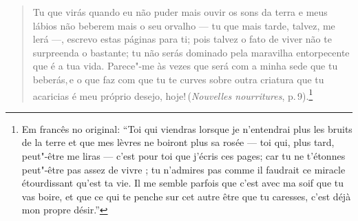 \begin{quote}
Tu que virás quando eu não puder mais ouvir os sons da terra e meus
lábios não beberem mais o seu orvalho --- tu que mais tarde, talvez, me
lerá ---, escrevo estas páginas para ti; pois talvez o fato de viver não te
surpreenda o bastante; tu não serás dominado pela maravilha entorpecente
que é a tua vida. Parece"-me às vezes que será com a minha sede que tu
beberás,\,e o que faz com que tu te curves sobre outra criatura que tu\,acaricias é meu próprio desejo, hoje!\,(\emph{Nouvelles nourritures}, p.\,9).\footnote{Em francês no original: ``Toi qui viendras lorsque je
  n'entendrai plus les bruits de la terre et que mes lèvres ne boiront
  plus sa rosée --- toi qui, plus tard, peut"-être me liras --- c'est pour
  toi que j'écris ces pages; car tu ne t'étonnes peut"-être pas assez de
  vivre ; tu n'admires pas comme il faudrait ce miracle étourdissant
  qu'est ta vie. Il me semble parfois que c'est avec ma soif que tu vas %
  boire, et que ce qui te penche sur cet autre être que tu caresses,
  c'est déjà mon propre désir.'' \versal{[N.~T.]}} %
\end{quote}